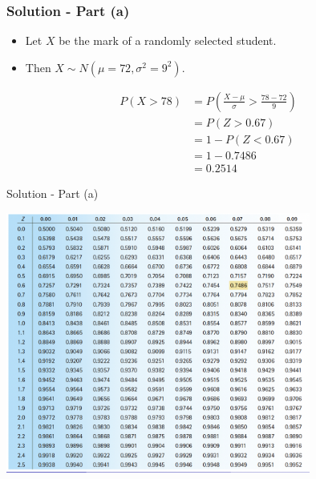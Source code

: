 \documentclass[12pt]{beamer}
\begin{document}
\begin{frame}
	\frametitle{Solution - Part (a)}
	
	\begin{itemize}[label={\color{blue}$\blacktriangleright$}]
		\item Let $X$ be the mark of a randomly selected student.
		\item Then $X \sim N(\mu = 72, \sigma^2 = 9^2)$.
	\end{itemize}
	
	\vspace{0.5em}
	
	\begin{align*}
		P(X > 78) &= P\left(\frac{X - \mu}{\sigma} > \frac{78 - 72}{9}\right) \\[0.5em]
		&= P(Z > 0.67) \\[0.5em]
		&= 1 - P(Z < 0.67) \\[0.5em]
		&= 1 - 0.7486 \\[0.5em]
		&= 0.2514
	\end{align*}
	
\end{frame}
\begin{frame}{Solution - Part (a)}
	
	\centering
	\includegraphics[width=10cm]{ztable.png}

\end{frame}
\end{document}

